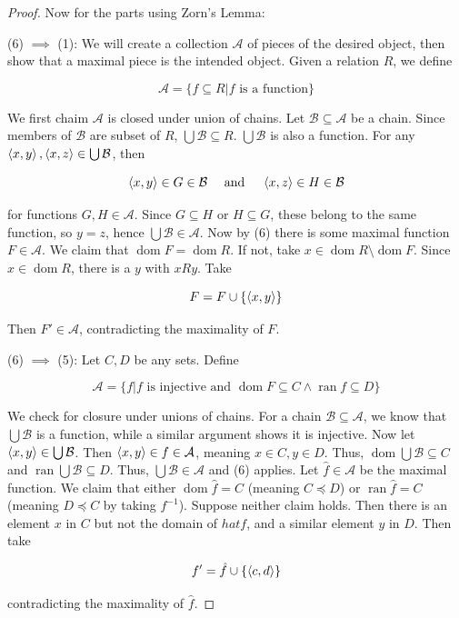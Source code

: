 \begin{proof}
    Now for the parts using Zorn's Lemma: 

    (6) $\implies$ (1): We will create a collection $\mathcal{A}$ of pieces of the desired object, then show that a maximal piece is the intended object. Given a relation $R$, we define 

    \[\mathcal{A} = \{f \subseteq R | f \text{ is a function}\}\]

    We first chaim $\mathcal{A}$ is closed under union of chains. Let $\mathcal{B} \subseteq \mathcal{A}$ be a chain. Since members of $\mathcal{B}$ are subset of $R$, $\bigcup \mathcal{B} \subseteq R$. $\bigcup \mathcal{B}$ is also a function. For any $\left\langle x,y \right\rangle, \left\langle x,z \right\rangle \in \bigcup \mathcal{B}$, then 

    \[\left\langle x,y \right\rangle \in G \in \mathcal{B} \quad \text{ and } \quad \left\langle x,z \right\rangle \in H \in \mathcal{B}\]

    for functions $G,H \in \mathcal{A}$. Since $G \subseteq H$ or $H \subseteq G$, these belong to the same function, so $y = z$, hence $\bigcup \mathcal{B} \in \mathcal{A}$. Now by (6) there is some maximal function $F \in \mathcal{A}$. We claim that $\operatorname{dom}F = \operatorname{dom}R$. If not, take $x \in \operatorname{dom}R \setminus \operatorname{dom}F$. Since $x \in \operatorname{dom}R$, there is a $y$ with $xRy$. Take 

    \[F = F \cup \{\left\langle x,y \right\rangle\}\]

    Then $F' \in \mathcal{A}$, contradicting the maximality of $F$. 

    (6) $\implies$ (5): Let $C,D$ be any sets. Define 

    \[\mathcal{A} = \{f | f \text{ is injective and $\operatorname{dom}F \subseteq C \wedge \operatorname{ran} f \subseteq D$}\}\]

    We check for closure under unions of chains. For a chain $\mathcal{B} \subseteq \mathcal{A}$, we know that $\bigcup \mathcal{B}$ is a function, while a similar argument shows it is injective. Now let $\left\langle x,y \right\rangle \in \bigcup \mathcal{B}$. Then $\left\langle x,y \right\rangle \in f \in \mathcal{A}$, meaning $x \in C, y \in D$. Thus, $\operatorname{dom}\bigcup\mathcal{B} \subseteq C$ and $\operatorname{ran}\bigcup\mathcal{B} \subseteq D$. Thus, $\bigcup \mathcal{B} \in \mathcal{A}$ and (6) applies. Let $\hat{f} \in \mathcal{A}$ be the maximal function. We claim that either $\operatorname{dom}\hat{f} = C$ (meaning $C \preceq D$) or $\operatorname{ran}\hat{f} = C$ (meaning $D \preceq C$ by taking $f^{-1}$). Suppose neither claim holds. Then there is an element $x$ in $C$ but not the domain of $hat{f}$, and a similar element $y$ in $D$. Then take 

    \[f' = \hat{f} \cup \{\left\langle c,d \right\rangle\}\]

    contradicting the maximality of $\hat{f}$. 
\end{proof}


